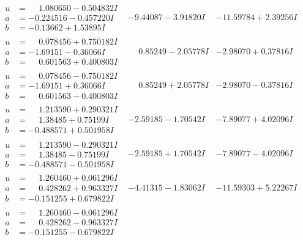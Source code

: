 \documentclass[1p]{elsarticle_modified}
\theoremstyle{definition}
\begin{document}
$$\begin{array}{c|c|c}
\begin{aligned}
u &= \phantom{-}1.080650 - 0.504832 I \\
a &= -0.224516 - 0.457220 I \\
b &= -0.13662 + 1.53895 I\end{aligned}
 & -9.44087 - 3.91820 I & -11.59784 + 2.39256 I \\ \hline\begin{aligned}
u &= \phantom{-}0.078456 + 0.750182 I \\
a &= -1.69151 - 0.36066 I \\
b &= \phantom{-}0.601563 + 0.400803 I\end{aligned}
 & \phantom{-}0.85249 - 2.05778 I & -2.98070 + 0.37816 I \\ \hline\begin{aligned}
u &= \phantom{-}0.078456 - 0.750182 I \\
a &= -1.69151 + 0.36066 I \\
b &= \phantom{-}0.601563 - 0.400803 I\end{aligned}
 & \phantom{-}0.85249 + 2.05778 I & -2.98070 - 0.37816 I \\ \hline\begin{aligned}
u &= \phantom{-}1.213590 + 0.290321 I \\
a &= \phantom{-}1.38485 + 0.75199 I \\
b &= -0.488571 + 0.501958 I\end{aligned}
 & -2.59185 - 1.70542 I & -7.89077 + 4.02096 I \\ \hline\begin{aligned}
u &= \phantom{-}1.213590 - 0.290321 I \\
a &= \phantom{-}1.38485 - 0.75199 I \\
b &= -0.488571 - 0.501958 I\end{aligned}
 & -2.59185 + 1.70542 I & -7.89077 - 4.02096 I \\ \hline\begin{aligned}
u &= \phantom{-}1.260460 + 0.061296 I \\
a &= \phantom{-}0.428262 + 0.963327 I \\
b &= -0.151255 + 0.679822 I\end{aligned}
 & -4.41315 - 1.83062 I & -11.59303 + 5.22267 I \\ \hline\begin{aligned}
u &= \phantom{-}1.260460 - 0.061296 I \\
a &= \phantom{-}0.428262 - 0.963327 I \\
b &= -0.151255 - 0.679822 I\end{aligned}

\end{array}$$
\end{document}
